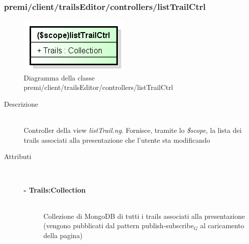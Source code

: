 \subsubsection{premi/client/trailsEditor/controllers/listTrailCtrl}
\begin{figure}[h]
\begin{center}
\includegraphics[scale=0.55]{img/diacla/listTrailCtrl.png}
\caption{Diagramma della classe premi/client/trailsEditor/controllers/listTrailCtrl}
\end{center}
\end{figure}


\begin{description}
\item[Descrizione] \hfill \\
	Controller della view \textit{listTrail.ng}. Fornisce, tramite lo \textit{\$scope}, la lista dei trails associati alla presentazione che l'utente sta modificando
	
	
\item[Attributi] \hfill \\
	\begin{description}
		\item[\textbf{- Trails:Collection			}] \hfill \\
			Collezione di MongoDB di tutti i trails associati alla presentazione (vengono pubblicati dal pattern publish-subscribe$_G$ al caricamento della pagina)	
	\end{description}
\end{description}








